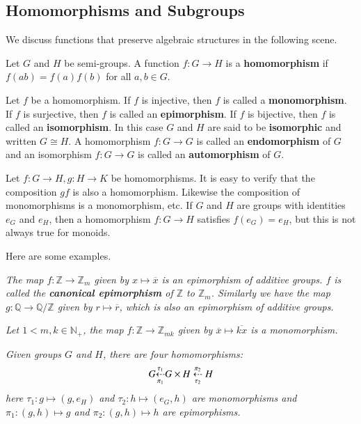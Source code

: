 \subsection{Homomorphisms and Subgroups}
We discuss functions that preserve algebraic structures in the following scene.
\begin{definition}
Let $G$ and $H$ be semi-groups. A function $f:G\to H$ is a \textbf{homomorphism} if $f(ab)=f(a)f(b)$ for all $a,b\in G$.
\end{definition}
Let $f$ be a homomorphism. If $f$ is injective, then $f$ is called a \textbf{monomorphism}. If $f$ is surjective, then $f$ is called an \textbf{epimorphism}. If $f$ is bijective, then $f$ is called an \textbf{isomorphism}. In this case $G$ and $H$ are said to be \textbf{isomorphic} and written $G\cong H$. A homomorphism $f:G\to G$ is called an \textbf{endomorphism} of $G$ and an isomorphism $f:G\to G$ is called an \textbf{automorphism} of $G$.\par
Let $f:G\to H,g:H\to K$ be homomorphisms. It is easy to verify that the composition $gf$ is also a homomorphism. Likewise the composition of monomorphisms is a monomorphism, etc. If $G$ and $H$ are groups with identities $e_G$ and $e_H$, then a homomorphism $f:G\to H$ satisfies $f(e_G)=e_H$, but this is not always true for monoids.\par
Here are some examples.\par
\begin{example}\em
The map $f:\mathbb{Z}\to\mathbb{Z}_m$ given by $x\mapsto\overline{x}$ is an epimorphism of additive groups. $f$ is called the \textbf{canonical epimorphism} of $\mathbb{Z}$ to $\mathbb{Z}_m$. Similarly we have the map $g:\mathbb{Q}\to\mathbb{Q}/\mathbb{Z}$ given by $r\mapsto\overline{r}$, which is also an epimorphism of additive groups.
\end{example}
\begin{example}\em
Let $1<m,k\in\mathbb{N}_+$, the map $f:\mathbb{Z}\to\mathbb{Z}_{mk}$ given by $\overline{x}\mapsto\overline{kx}$ is a monomorphism.
\end{example}
\begin{example}\em
Given groups $G$ and $H$, there are four homomorphisms:
$$
G\small{\underset{\pi _1}{\overset{\tau _1}{\dashleftarrow}}}G\times H\underset{\tau _2}{\overset{\pi _2}{\dashleftarrow}}H
$$
here $\tau_1:g\mapsto(g,e_H)$ and $\tau_2:h\mapsto(e_G,h)$ are monomorphisms and $\pi_1:(g,h)\mapsto g$ and $\pi_2:(g,h)\mapsto h$ are epimorphisms.
\end{example}
